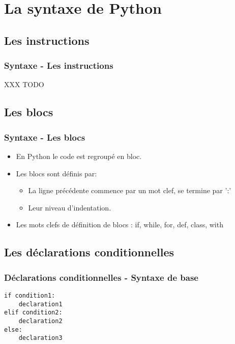 \section{La syntaxe de Python}

\subsection{Les instructions}
\begin{frame}
  \frametitle{Syntaxe - Les instructions}
XXX TODO
\end{frame}

\subsection{Les blocs}
\begin{frame}[fragile]
  \frametitle{Syntaxe - Les blocs}
  \begin{itemize}
    \item En Python le code est regroupé en bloc.
    \item Les blocs sont définis par:
    \begin{itemize}
      \item La ligne précédente commence par un mot clef, se termine par ':'
      \item Leur niveau d'indentation.
    \end{itemize}
    \item Les mots clefs de définition de blocs : \alert<1->{if}, \alert<2->{while}, \alert<3->{for}, \alert<4->{def}, \alert<5->{class}, \alert<6->{with}
  \end{itemize}

\end{frame}

\subsection{Les déclarations conditionnelles}
\begin{frame}[fragile]
  \frametitle{Déclarations conditionnelles - Syntaxe de base}
  \begin{lstlisting}
if condition1:
    declaration1
elif condition2:
    declaration2
else:
    declaration3
  \end{lstlisting}
\end{frame}

